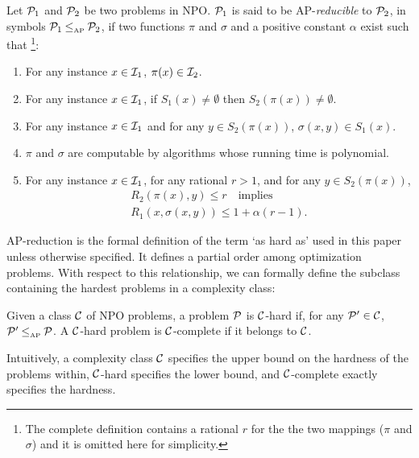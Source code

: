 \begin{definition}\label{def:AP-red}
Let $\P_1$ and $\P_2$ be two problems in NPO. $\P_1$ is said to be AP-{\em reducible} to $\P_2$, in symbols $\P_1 \leqAP \P_2$, if two functions $\pi$ and $\sigma$ and a positive constant $\alpha$ exist such that \footnote{The complete definition contains a rational $r$ for the the two mappings ($\pi$ and $\sigma$) and it is omitted here for simplicity.}:
\begin{enumerate}
\item For any instance $x\in \I_1$, $\pi(x) \in \I_2$.
\item For any instance $x\in \I_1$, if $S_1(x) \neq \emptyset$ then $S_2(\pi(x)) \neq \emptyset$.
\item For any instance $x\in \I_1$ and for any $y \in S_2(\pi(x))$, $\sigma(x, y) \in S_1(x)$.
\item $\pi$ and $\sigma$ are computable by algorithms whose running time is polynomial.
\item For any instance $x\in \I_1$, for any rational $r > 1$, and for any $y \in S_2(\pi(x))$,
\begin{align} \label{eq:AP-red}
R_2(\pi(x),y) \leq r \quad \text{implies} \\
R_1(x, \sigma(x, y)) \leq 1 + \alpha(r-1).
\end{align}
\end{enumerate}
\end{definition}

AP-reduction is the formal definition of the term `as hard as' used in this paper unless otherwise specified. It defines a partial order among optimization problems. With respect to this relationship, we can formally define the subclass containing the hardest problems in a complexity class:

\begin{definition}\label{def:complete} Given a class $\C$ of NPO problems, a problem $\P$ is $\C$-hard if, for any $\P' \in \C$, $\P' \leqAP \P$. A $\C$-hard problem is $\C$-complete if it belongs to $\C$.
\end{definition}

Intuitively, a complexity class $\C$ specifies the upper bound on the hardness of the problems within, $\C$-hard specifies the lower bound, and $\C$-complete exactly specifies the hardness.